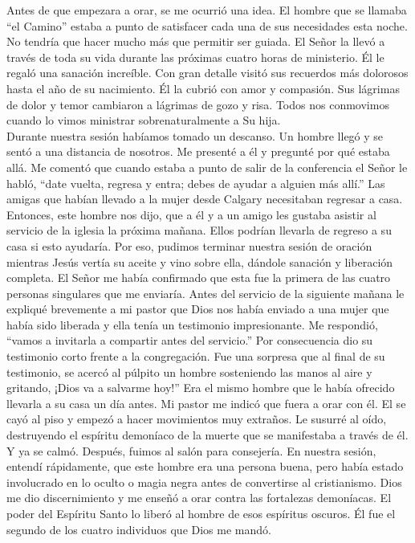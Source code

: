 \documentclass[twoside, 12pt]{book}
\begin{document}
Antes de que empezara a orar, se me ocurrió una idea. El hombre que se llamaba “el Camino” estaba a punto de satisfacer cada una de sus necesidades esta noche. No tendría que hacer mucho más que permitir ser guiada. El Señor la llevó a través de toda su vida durante las próximas cuatro horas de ministerio. Él le regaló una sanación increíble. Con gran detalle visitó sus recuerdos más dolorosos hasta el año de su nacimiento. Él la cubrió con amor y compasión. Sus lágrimas de dolor y temor cambiaron a lágrimas de gozo y risa. Todos nos conmovimos cuando lo vimos ministrar sobrenaturalmente a Su hija.\\

Durante nuestra sesión habíamos tomado un descanso. Un hombre llegó y se sentó a una distancia de nosotros. Me presenté a él y pregunté por qué estaba allá. Me comentó que cuando estaba a punto de salir de la conferencia el Señor le habló, “date vuelta, regresa y entra; debes de ayudar a alguien más allí.” Las amigas que habían llevado a la mujer desde Calgary necesitaban regresar a casa. Entonces, este hombre nos dijo, que a él y a un amigo les gustaba asistir al servicio de la iglesia la próxima mañana. Ellos podrían llevarla de regreso a su casa si esto ayudaría. Por eso, pudimos terminar nuestra sesión de oración mientras Jesús vertía su aceite y vino sobre ella, dándole sanación y liberación completa.  El Señor me había confirmado que esta fue la primera de las cuatro personas singulares que me enviaría. Antes del servicio de la siguiente mañana le expliqué brevemente a mi pastor que Dios nos había enviado a una mujer que había sido liberada y ella tenía un testimonio impresionante. Me respondió, “vamos a invitarla a compartir antes del servicio.”  Por consecuencia dio su testimonio corto frente a la congregación.
Fue una sorpresa que al final de su testimonio, se acercó al púlpito un hombre sosteniendo las manos al aire y gritando, ¡Dios va a salvarme hoy!” Era el mismo hombre que le había ofrecido llevarla a su casa un día antes. Mi pastor me indicó que fuera a orar con él.  El se cayó al piso y empezó a hacer movimientos muy extraños. Le susurré al oído, destruyendo el espíritu demoníaco de la muerte que se manifestaba a través de él. Y ya se calmó. Después, fuimos al salón para consejería. En nuestra sesión, entendí rápidamente, que este hombre era una persona buena, pero había estado involucrado en lo oculto o magia negra antes de convertirse al cristianismo.  Dios me dio discernimiento y me enseñó a orar contra las fortalezas demoníacas. El poder del Espíritu Santo lo liberó al hombre de esos espíritus oscuros. Él fue el segundo de los cuatro individuos que Dios me mandó.\\
\end{document}
